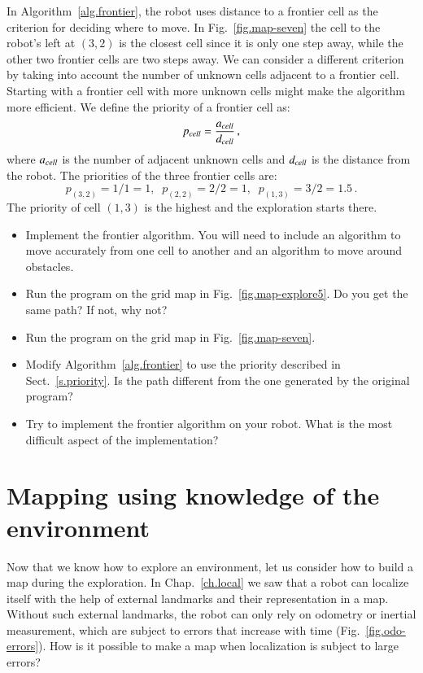 In Algorithm~\ref{alg.frontier}, the robot uses distance to a frontier cell as the criterion for deciding where to move. In Fig.~\ref{fig.map-seven} the cell to the robot's left at $(3,2)$ is the closest cell since it is only one step away, while the other two frontier cells are two steps away. We can consider a different criterion by taking into account the number of unknown cells adjacent to a frontier cell. Starting with a frontier cell with more unknown cells might make the algorithm more efficient. We define the priority of a frontier cell as:
\[
p_{\textit{\scriptsize cell}} = \frac{a_{\textit{\scriptsize cell}}}{d_{\textit{\scriptsize cell}}}\,,
\]
where $a_{\textit{\scriptsize cell}}$ is the number of adjacent unknown cells and $d_{\textit{\scriptsize cell}}$ is the distance from the robot. The priorities of the three frontier cells are:
\[
p_{(3,2)} = 1/1 = 1,\;\;p_{(2,2)} = 2/2 = 1,\;\;p_{(1,3)} = 3/2 = 1.5\,.
\]
The priority of cell $(1,3)$ is the highest and the exploration starts there.

\begin{framed}
\begin{itemize}
\item Implement the frontier algorithm. You will need to include an algorithm to move accurately from one cell to another and an algorithm to move around obstacles.
\item Run the program on the grid map in Fig.~\ref{fig.map-explore5}. Do you get the same path? If not, why not?
\item Run the program on the grid map in Fig.~\ref{fig.map-seven}.
\item Modify Algorithm~\ref{alg.frontier} to use the priority described in Sect.~\ref{s.priority}. Is the path different from the one generated by the original program?
\item Try to implement the frontier algorithm on your robot. What is the most difficult aspect of the implementation?
\end{itemize}
\end{framed}

\section{Mapping using knowledge of the environment}\label{s.map-update}

Now that we know how to explore an environment, let us consider how to build a map during the exploration. In Chap.~\ref{ch.local} we saw that a robot can localize itself with the help of external landmarks and their representation in a map. Without such external landmarks, the robot can only rely on odometry or inertial measurement, which are subject to errors that increase with time (Fig.~\ref{fig.odo-errors}). How is it possible to make a map when localization is subject to large errors?

